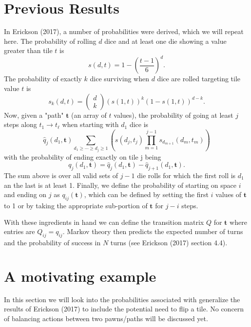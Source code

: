 \documentclass[letterpaper,11pt]{article}
\begin{document}
\section{Previous Results}
In Erickson (2017), a number of probabilities were derived, which we will
repeat here.  The probability of rolling $d$ dice and at least one die showing
a value greater than tile $t$ is
\begin{equation}
	s\left(d,t\right) = 1-\left(\frac{t-1}{6}\right)^d.
\end{equation}
The probability of exactly $k$ dice surviving when $d$ dice are rolled targeting
tile value $t$ is
\begin{equation}
	s_k\left(d,t\right)=\left(
	\begin{array}{c}
		d \\
		k
	\end{array} \right) \left(s\left(1,t\right)\right)^k
	\left(1-s\left(1,t\right)\right)^{d-k}.
\end{equation}
Now, given a "path" $\mathbf{t}$ (an array of $t$ values), the probability of
going at least $j$ steps along $t_1 \rightarrow t_\ell$ when starting with
$d_1$ dice is
\begin{equation}
	\hat{q}_j\left(d_1,\mathbf{t}\right) \sum_{d_1\geq\cdots\geq d_j\geq 1}
	\left( s\left(d_j,t_j\right)
	\prod_{m=1}^{j-1} s_{d_{m+1}}\left(d_m,t_m\right)\right)
\end{equation}
with the probability of ending exactly on tile j being
\begin{equation}
	q_j\left(d_1,\mathbf{t}\right)= \hat{q}_j\left(d_1,\mathbf{t}\right) -
	\hat{q}_{j+1}\left(d_1,\mathbf{t}\right).
\end{equation}
The sum above is over all valid sets of $j-1$ die rolls for which the first roll
is $d_1$ an the last is at least 1.  Finally, we define the probability of
starting on space $i$ and ending on $j$ as $q_{ij}(\mathbf{t})$, which can be
defined by setting the first $i$ values of $\mathbf{t}$ to 1 or by taking the
appropriate sub-portion of $\mathbf{t}$ for $j-i$ steps.

With these ingredients in hand we can define the transition matrix $Q$ for
$\mathbf{t}$ where entries are $Q_{ij}=q_{ij}$.  Markov theory then predicts
the expected number of turns and the probability of success in $N$ turns (see
Erickson (2017) section 4.4).  

\section{A motivating example}
In this section we will look into the probabilities associated with  generalize the results of Erickson (2017) to include
the potential need to flip a tile.  No concern of balancing actions between two
pawns/paths will be discussed yet.
\end{document}
